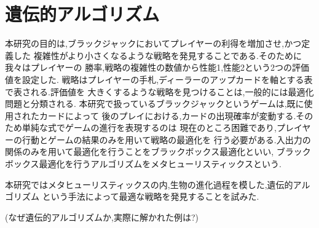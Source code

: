 \section{遺伝的アルゴリズム}
本研究の目的は,ブラックジャックにおいてプレイヤーの利得を増加させ,かつ定義した
複雑性がより小さくなるような戦略を発見することである.そのために我々はプレイヤーの
勝率,戦略の複雑性の数値から性能1,性能2という2つの評価値を設定した.
戦略はプレイヤーの手札,ディーラーのアップカードを軸とする表で表される.評価値を
大きくするような戦略を見つけることは,一般的には最適化問題と分類される.
本研究で扱っているブラックジャックというゲームは,既に使用されたカードによって
後のプレイにおける,カードの出現確率が変動する.そのため単純な式でゲームの進行を表現するのは
現在のところ困難であり,プレイヤーの行動とゲームの結果のみを用いて戦略の最適化を
行う必要がある.入出力の関係のみを用いて最適化を行うことをブラックボックス最適化といい,
ブラックボックス最適化を行うアルゴリズムをメタヒューリスティックスという.

本研究ではメタヒューリスティックスの内,生物の進化過程を模した,遺伝的アルゴリズム
という手法によって最適な戦略を発見することを試みた.

(なぜ遺伝的アルゴリズムか,実際に解かれた例は?)

